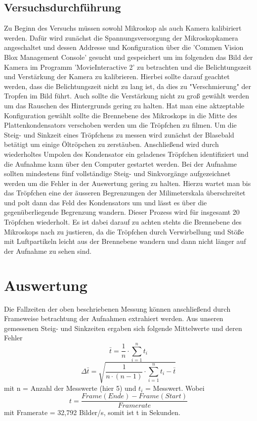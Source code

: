 \documentclass{scrartcl}
\begin{document}
	\subsection{Versuchsdurchführung}
		Zu Beginn des Versuchs müssen sowohl Mikroskop als auch Kamera kalibiriert werden. Dafür wird zunächst die
		Spannungsversorgung der Mikroskopkamera angeschaltet und dessen Addresse und Konfiguration über die 'Commen Vision Blox Management Console'
		gesucht und gespeichert um im folgenden das Bild der Kamera im Programm 'MovieInteractive 2' zu betrachten
		und die Belichtungszeit und Verstärkung der Kamera zu kalibrieren. Hierbei sollte darauf geachtet werden, dass die 
		Belichtungszeit nicht zu lang ist, da dies zu "Verschmierung" der Tropfen im Bild führt. Auch sollte 
		die Verstärkung nicht zu groß gewählt werden um das Rauschen des Hintergrunds gering zu halten. Hat man 
		eine aktzeptable Konfiguration gewählt sollte die Brennebene des Mikroskops in die Mitte des Plattenkondensators
		verschoben werden um die Tröpfchen zu filmen.
		Um die Steig- und Sinkzeit eines Tröpfchens zu messen wird zunächst der Blasebald betätigt um einige
		Öltröpchen zu zerstäuben. Anschließend wird durch wiederholtes Umpolen des Kondensator ein geladenes Tröpfchen 
		identifiziert und die Aufnahme kann über den Computer gestartet werden. Bei der Aufnahme sollten mindestens fünf
		vollständige Steig- und Sinkvorgänge aufgezeichnet werden um die Fehler in der Auswertung gering zu halten.
		Hierzu wartet man bis das Tröpfchen eine der äusseren Begrenzungen der Milimeterskala überschreitet und polt dann
		das Feld des Kondensators um und lässt es über die gegenüberliegende Begrenzung wandern.
		Dieser Prozess wird für insgesamt 20 Tröpfchen wiederholt. Es ist dabei darauf zu achten stehts
		die Brennebene des Mikroskops nach zu justieren, da die Tröpfchen durch Verwirbellung und Stöße mit 
		Luftpartikeln leicht aus der Brennebene wandern und dann nicht länger auf der Aufnahme zu sehen sind.
\section{Auswertung}
	Die Fallzeiten der oben beschriebenen Messung können anschließend durch Frameweise betrachtung der Aufnahmen
	extrahiert werden.
	Aus unseren gemessenen Steig- und Sinkzeiten ergaben sich folgende Mittelwerte und deren Fehler
	\begin{equation}
		\bar{t} = \frac{1}{n} \cdot \sum_{i=1}^n t_i
	\end{equation}
	\begin{equation}
		\Delta \bar{t} = \sqrt{\frac{1}{n\cdot(n-1)}\cdot \sum_{i=1}^n{t_i - \bar{t}}}
	\end{equation}
	mit n = Anzahl der Messwerte (hier 5) und $t_i$ = Messwert.
	Wobei 
	\begin{equation}
		t = \frac{Frame(Ende)-Frame(Start)}{Framerate}
	\end{equation}
	mit Framerate = 32,792 Bilder/s, somit ist t in Sekunden.
\end{document}
